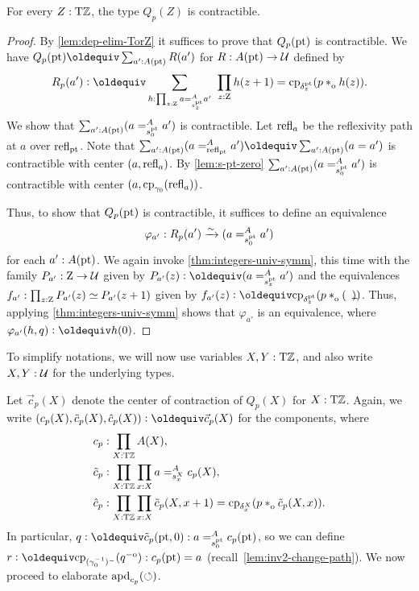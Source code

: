 \documentclass[a4paper,12pt]{amsart}
\begin{document}
\begin{lemma}\label{lem:guided-null-hmtps-dep}
  For every $Z:{\mathrm{T}\mathbb{Z}}$, the type $Q_p(Z)$ is contractible.
\end{lemma}
\begin{proof}
  By \cref{lem:dep-elim-TorZ} it suffices to prove that $Q_p({\mathord{\mathrm{pt}}})$ is contractible.
  We have $Q_p(\pt)\jdeq \sum_{a':A(\pt)} R(a')$ for $R : A({\mathord{\mathrm{pt}}}) \to \mathcal{U}$ defined by
  \[
    R_p(a') \defeq \sum_{h : \prod_{z:\zet} a =^A_{s^\pt_z} a'}~
    \prod_{z:\zet} h(z+1) = \cp{\delta^\pt_z}(p \cto h(z)).
  \]
  We show that $\sum_{a':A({\mathord{\mathrm{pt}}})} (a =^A_{s^{\mathord{\mathrm{pt}}}_0} {a'})$ is contractible.
  Let $\mathop{{\mathrm{refl}}_{a}}$ be the reflexivity path at $a$ over $\mathop{{\mathrm{refl}}_{{\mathord{\mathrm{pt}}}}}$.
  Note that $\sum_{a':A(\pt)} (a =^A_{\refl{\pt}} a') \jdeq \sum_{a':A(\pt)} (a = a')$
  is contractible with center $(a,\mathop{{\mathrm{refl}}_{a}})$. By \cref{lem:s-pt-zero}
  $\sum_{a':A({\mathord{\mathrm{pt}}})} (a =^A_{s^{\mathord{\mathrm{pt}}}_0} {a'})$ is contractible with center
  $(a,\mathrm{cp}_{\gamma_0}(\mathop{{\mathrm{refl}}_{a}}))$.

  Thus, to show that $Q_p({\mathord{\mathrm{pt}}})$ is contractible,
  it suffices to define an equivalence
  \[
    \varphi_{a'} : R_p(a') \xrightarrow{\sim}{} (a =^A_{s^{\mathord{\mathrm{pt}}}_0} {a'})
  \]
  for each $a' : A({\mathord{\mathrm{pt}}})$.
  We again invoke \cref{thm:integers-univ-symm},
  this time with the family $P_{a'} : \mathrm{Z} \to \mathcal{U}$ given
  by $P_{a'}(z) \defeq (a =^A_{s^\pt_z} {a'})$
  and the equivalences $f_{a'} : \prod_{z:\mathrm{Z}} P_{a'}(z)\simeq P_{a'}(z+1)$
  given by $f_{a'}(z) \defeq \cp{\delta^\pt_z}(p \cto (\blank))$.
  Thus, applying \cref{thm:integers-univ-symm}
  shows that $\varphi_{a'}$ is an equivalence,
  where $\varphi_{a'}(h,q) \defeq h(0)$.
\end{proof}

To simplify notations, we will now use variables $X,Y:{\mathrm{T}\mathbb{Z}}$,
and also write $X,Y:\mathcal{U}$ for the underlying types.

Let $\vec c_p(X)$ denote the center of contraction of $Q_p(X)$ for $X:{\mathrm{T}\mathbb{Z}}$.
Again, we write $(c_p(X),\tilde{c}_p(X),\hat{c}_p(X))\defeq\vec{c}_p(X)$
for the components, where
\begin{align*}
         c_p &: \prod_{X:\TorZ} A(X),\\
  \tilde c_p &: \prod_{X:\TorZ}\prod_{x:X} a =^A_{s^X_x} c_p(X), \\
    \hat c_p &: \prod_{X:\TorZ}\prod_{x:X} \tilde c_p(X,x+1)
               = \cp{\delta^X_x}(p \cto \tilde c_p(X,x)).
\end{align*}
In particular, $q\defeq \tilde c_p(\pt,0) : a =^A_{s^\pt_0} c_p(\pt)$,
so we can define $r\defeq \cp{(\gamma_0^{-1})^-}(q\invo) : c_p(\pt) = a$
(recall~\cref{lem:inv2-change-path}).
We now proceed to elaborate $\mathop{{\mathrm{apd}}_{c_p}}({\circlearrowleft})$.
\end{document}
